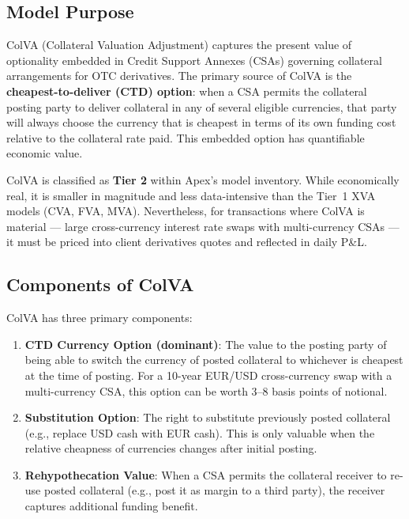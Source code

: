 \documentclass[11pt,a4paper]{article}
\begin{document}
\subsection{Model Purpose}

ColVA (Collateral Valuation Adjustment) captures the present value of optionality embedded in
Credit Support Annexes (CSAs) governing collateral arrangements for OTC derivatives. The primary
source of ColVA is the \textbf{cheapest-to-deliver (CTD) option}: when a CSA permits the
collateral posting party to deliver collateral in any of several eligible currencies, that party
will always choose the currency that is cheapest in terms of its own funding cost relative to
the collateral rate paid. This embedded option has quantifiable economic value.

ColVA is classified as \textbf{Tier 2} within Apex's model inventory. While economically real,
it is smaller in magnitude and less data-intensive than the Tier~1 XVA models (CVA, FVA, MVA).
Nevertheless, for transactions where ColVA is material --- large cross-currency interest rate
swaps with multi-currency CSAs --- it must be priced into client derivatives quotes and
reflected in daily P\&L.

\subsection{Components of ColVA}

ColVA has three primary components:

\begin{enumerate}[leftmargin=*]
  \item \textbf{CTD Currency Option (dominant)}: The value to the posting party of being able to switch the currency of posted collateral to whichever is cheapest at the time of posting. For a 10-year EUR/USD cross-currency swap with a multi-currency CSA, this option can be worth 3--8 basis points of notional.

  \item \textbf{Substitution Option}: The right to substitute previously posted collateral (e.g., replace USD cash with EUR cash). This is only valuable when the relative cheapness of currencies changes after initial posting.

  \item \textbf{Rehypothecation Value}: When a CSA permits the collateral receiver to re-use posted collateral (e.g., post it as margin to a third party), the receiver captures additional funding benefit.
\end{enumerate}
\end{document}
